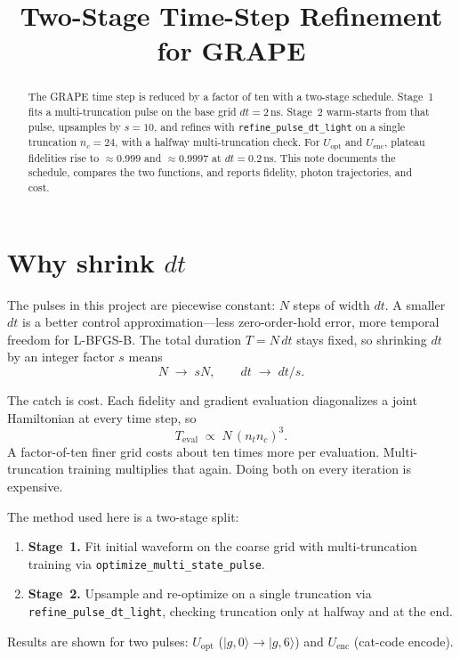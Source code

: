 \documentclass[11pt]{article}
\title{Two-Stage Time-Step Refinement for GRAPE}
\author{}
\date{}
\begin{document}
\sloppy
\maketitle

\begin{abstract}
The GRAPE time step is reduced by a factor of ten with a two-stage schedule.
Stage~1 fits a multi-truncation pulse on the base grid $dt=2\,\mathrm{ns}$.
Stage~2 warm-starts from that pulse, upsamples by $s=10$, and refines with
\texttt{refine\_pulse\_dt\_light} on a single truncation $n_c=24$, with a
halfway multi-truncation check. For $U_{\mathrm{opt}}$ and $U_{\mathrm{enc}}$,
plateau fidelities rise to $\approx 0.999$ and $\approx 0.9997$ at
$dt=0.2\,\mathrm{ns}$. This note documents the schedule, compares the two
functions, and reports fidelity, photon trajectories, and cost.
\end{abstract}

\section{Why shrink $dt$}
\label{sec:intro}

The pulses in this project are piecewise constant: $N$ steps of width $dt$.
A smaller $dt$ is a better control approximation---less zero-order-hold error,
more temporal freedom for L-BFGS-B. The total duration $T=N\,dt$ stays fixed,
so shrinking $dt$ by an integer factor $s$ means
\begin{equation}
  N \;\rightarrow\; sN, \qquad dt \;\rightarrow\; dt/s.
\end{equation}

The catch is cost. Each fidelity and gradient evaluation diagonalizes a
joint Hamiltonian at every time step, so
\begin{equation}
  T_{\mathrm{eval}} \;\propto\; N\,(n_t n_c)^3.
  \label{eq:cost}
\end{equation}
A factor-of-ten finer grid costs about ten times more per evaluation. Multi-
truncation training multiplies that again. Doing both on every iteration is
expensive.

The method used here is a two-stage split:
\begin{enumerate}
  \item \textbf{Stage~1.} Fit initial waveform on the coarse grid with multi-truncation
        training via \texttt{optimize\_multi\_state\_pulse}.
  \item \textbf{Stage~2.} Upsample and re-optimize on a single truncation
        via \texttt{refine\_pulse\_dt\_light}, checking truncation only at
        halfway and at the end.
\end{enumerate}
Results are shown for two pulses: $U_{\mathrm{opt}}$
($\lvert g,0\rangle\to\lvert g,6\rangle$) and $U_{\mathrm{enc}}$
(cat-code encode).
\end{document}
